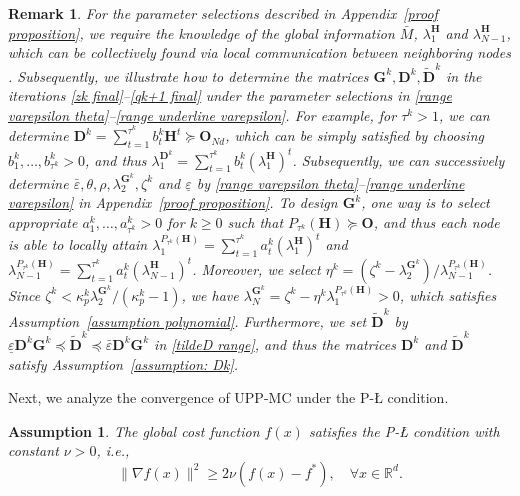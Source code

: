 \documentclass[12pt,draftcls,onecolumn]{IEEEtran}
\renewcommand{\Re}{{\mathbb{R}}}
\newtheorem{remark}{Remark}
\newtheorem{assumption}{Assumption}
\begin{document}
\begin{remark}
	For the parameter selections described in Appendix~\ref{proof proposition}, we require the knowledge of the global information $\bar{M}$, $\lambda_1^{\mathbf{H}}$ and $\lambda_{N-1}^{\mathbf{H}}$, which can be collectively found via local communication between neighboring nodes \cite{Wu2020ASP}. Subsequently, we illustrate how to determine the matrices $\mathbf{G}^k,\mathbf{D}^k,\mathbf{\tilde{D}}^k$ in the iterations \eqref{zk final}--\eqref{qk+1 final} under the parameter selections in \eqref{range varepsilon theta}--\eqref{range underline varepsilon}. For example, for $\tau^k>1$, we can determine ${\mathbf{D}^k}=\sum_{t=1}^{\tau^k}b_t^k\mathbf{H}^t \succeq \mathbf{O}_{Nd}$, which can be simply satisfied by choosing $b_1^k,\dots,b_{\tau^k}^k>0$, and thus $\lambda_{1}^{\mathbf{D}^k}=\sum_{t=1}^{\tau^k}b_t^k({\lambda}_1^\mathbf{H})^t$. Subsequently, we can successively determine $\bar{\varepsilon}, \theta, \rho, \lambda_{2}^{\mathbf{G}^k}, \zeta^k$ and $\underline{\varepsilon}$ by \eqref{range varepsilon theta}--\eqref{range underline varepsilon} in Appendix~\ref{proof proposition}. To design $\mathbf{G}^k$, one way is to select appropriate $a_1^k,\dots, a_{\tau^k}^k>0$ for $k\geq 0$ such that $P_{\tau^k}(\mathbf{H})\succeq \mathbf{O}$, and thus each node is able to locally attain ${\lambda}_1^{P_{\tau^k}(\mathbf{H})} = \sum_{t=1}^{\tau^k}a_t^k({\lambda}_1^\mathbf{H})^t$ and ${\lambda}_{N-1}^{P_{\tau^k}(\mathbf{H})} = \sum_{t=1}^{\tau^k}a_t^k({\lambda}_{N-1}^\mathbf{H})^t$. Moreover, we select $\eta^k=(\zeta^k-\lambda_2^{\mathbf{G}^k})/\lambda_{N-1}^{P_{\tau^k}(\mathbf{H})}$. Since $\zeta^k < \kappa_p^k\lambda_{2}^{\mathbf{G}^k}/(\kappa_p^k-1)$, we have $\lambda_N^{\mathbf{G}^k} = \zeta^k - \eta^k\lambda_1^{P_{\tau^k}(\mathbf{H})}>0$, which satisfies Assumption~\ref{assumption polynomial}. Furthermore, we set $\tilde{\mathbf{D}}^k$ by $\underline{\varepsilon}\mathbf{D}^k\mathbf{G}^k\preceq\tilde{\mathbf{D}}^k \preceq \bar{\varepsilon}\mathbf{D}^k\mathbf{G}^k$ in \eqref{tildeD range}, and thus the matrices $\mathbf{D}^k$ and $\tilde{\mathbf{D}}^k$ satisfy Assumption~\ref{assumption: Dk}.
\end{remark}

Next, we analyze the convergence of UPP-MC under the P-{\L} condition.
\begin{assumption}\label{PL condition}
	The global cost function $f(x)$ satisfies the P-{\L} condition with constant $\nu>0$, i.e.,
	\begin{equation}
		\|\nabla f(x)\|^2 \geq 2\nu (f(x) - f^*), \quad \forall x \in \Re ^d. \label{pl}
	\end{equation}
\end{assumption}
\end{document}
